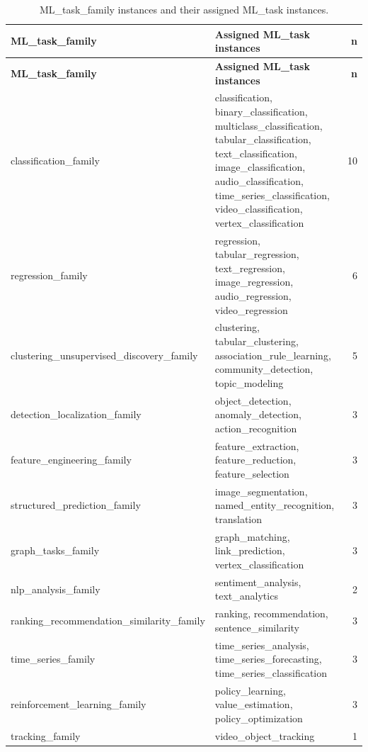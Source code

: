 \begin{xltabular}{\textwidth}{>{\raggedright\arraybackslash}p{4cm}Xr}
\caption[ML\_task\_family instances]{ML\_task\_family instances and their assigned ML\_task instances.}
\label{tab:ml-task-families}\\
\toprule
\textbf{ML\_task\_family} & \textbf{Assigned ML\_task instances} & \textbf{n} \\
\midrule
\endfirsthead
\toprule
\textbf{ML\_task\_family} & \textbf{Assigned ML\_task instances} & \textbf{n} \\
\midrule
\endhead
\bottomrule
\endfoot
classification\_\allowbreak family
& classification, binary\_classification, multiclass\_classification,
    tabular\_classification, text\_classification, image\_classification,
    audio\_classification, time\_series\_classification, video\_classification,
    vertex\_classification & 10 \\
\midrule
regression\_\allowbreak family
& regression, tabular\_regression, text\_regression, image\_regression,
    audio\_regression, video\_regression & 6 \\
\midrule
clustering\_\allowbreak unsupervised\_\allowbreak discovery\_\allowbreak family
& clustering, tabular\_clustering, association\_rule\_learning,
    community\_detection, topic\_modeling & 5 \\
\midrule
detection\_\allowbreak localization\_\allowbreak family
& object\_detection, anomaly\_detection, action\_recognition & 3 \\
\midrule
feature\_\allowbreak engineering\_\allowbreak family
& feature\_extraction, feature\_reduction, feature\_selection & 3 \\
\midrule
structured\_\allowbreak prediction\_\allowbreak family
& image\_segmentation, named\_entity\_recognition, translation & 3 \\
\midrule
graph\_tasks\_\allowbreak family
& graph\_matching, link\_prediction, vertex\_classification & 3 \\
\midrule
nlp\_analysis\_\allowbreak family
& sentiment\_analysis, text\_analytics & 2 \\
\midrule
ranking\_\allowbreak recommendation\_\allowbreak similarity\_\allowbreak family
& ranking, recommendation, sentence\_similarity & 3 \\
\midrule
time\_series\_\allowbreak family
& time\_series\_analysis, time\_series\_forecasting, time\_series\_classification & 3 \\
\midrule
reinforcement\_\allowbreak learning\_\allowbreak family
& policy\_learning, value\_estimation, policy\_optimization & 3 \\
\midrule
tracking\_\allowbreak family
& video\_object\_tracking & 1 \\
\bottomrule
\end{xltabular}

